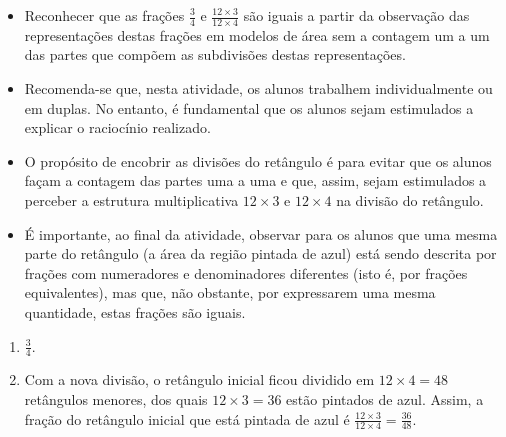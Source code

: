 \begin{atividade}\label{chap4-ativ3}
\objetivos
\begin{itemize} %
    \item       Reconhecer que as frações       $\frac{3}{4}$       e
$\frac{12 \times 3}{12 \times 4}$       são iguais a partir da observação das
representações destas frações em modelos de área sem a contagem um a um das
partes que compõem as subdivisões destas representações.
\end{itemize} %

\discussoes
\begin{itemize} %
    \item       Recomenda-se que, nesta atividade, os alunos trabalhem
individualmente ou em duplas. No entanto, é fundamental que os alunos sejam
estimulados a explicar o raciocínio realizado.
    \item       O propósito de encobrir as divisões do retângulo é para evitar
que os alunos façam a contagem das partes uma a uma e que, assim, sejam
estimulados a perceber a estrutura multiplicativa       $12 \times 3$       e
   $12 \times 4$       na divisão do retângulo.
    \item       É importante, ao final da atividade, observar para os alunos que
uma mesma parte do retângulo (a área da região pintada de azul) está sendo
descrita por frações com numeradores e denominadores diferentes (isto é, por
frações equivalentes), mas que, não obstante, por expressarem uma mesma
quantidade, estas frações são iguais.
\end{itemize} %

\solucao
\begin{enumerate} %
    \item             $\frac{3}{4}$.
    \item       Com a nova divisão, o retângulo inicial ficou dividido em       $12
\times 4 = 48$ retângulos menores, dos quais       $12 \times 3 = 36$       estão
pintados de azul. Assim, a fração do retângulo inicial que está pintada de azul é
      $\frac{12 \times 3}{12 \times 4} = \frac{36}{48}$.
\end{enumerate} %

\end{atividade}

\clearpage

